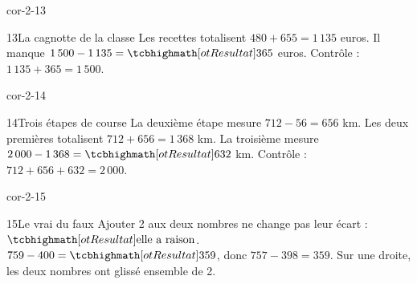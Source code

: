 \begin{blocLivre}{cor-2-13}\begin{corrige}{13}{La cagnotte de la classe}
Les recettes totalisent $480+655=1\,135$ euros. Il manque $1\,500-1\,135=\res{365}$ euros. Contrôle : $1\,135+365=1\,500$.
\end{corrige}\end{blocLivre}
\begin{blocLivre}{cor-2-14}\begin{corrige}{14}{Trois étapes de course}
La deuxième étape mesure $712-56=656$ km. Les deux premières totalisent $712+656=1\,368$ km. La troisième mesure $2\,000-1\,368=\res{632}$ km. Contrôle : $712+656+632=2\,000$.
\end{corrige}\end{blocLivre}
\begin{blocLivre}{cor-2-15}\begin{corrige}{15}{Le vrai du faux}
Ajouter 2 aux deux nombres ne change pas leur écart : $\res{\text{elle a raison}}$. $759-400=\res{359}$, donc $757-398=359$. Sur une droite, les deux nombres ont glissé ensemble de 2.
\end{corrige}\end{blocLivre}

